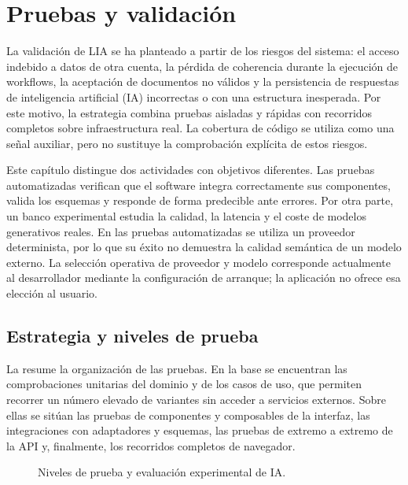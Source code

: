 \chapter{Pruebas y validación}
\label{chap:testing}

La validación de LIA se ha planteado a partir de los riesgos del sistema: el
acceso indebido a datos de otra cuenta, la pérdida de coherencia durante la
ejecución de workflows, la aceptación de documentos no válidos y la
persistencia de respuestas de inteligencia artificial (IA) incorrectas o con
una estructura inesperada. Por este motivo, la estrategia combina pruebas
aisladas y rápidas con recorridos completos sobre infraestructura real. La
cobertura de código se utiliza como una señal auxiliar, pero no sustituye la
comprobación explícita de estos riesgos.

Este capítulo distingue dos actividades con objetivos diferentes. Las pruebas
automatizadas verifican que el software integra correctamente sus componentes,
valida los esquemas y responde de forma predecible ante errores. Por otra
parte, un banco experimental estudia la calidad, la latencia y el coste de
modelos generativos reales. En las pruebas automatizadas se utiliza un
proveedor determinista, por lo que su éxito no demuestra la calidad semántica
de un modelo externo. La selección operativa de proveedor y modelo corresponde
actualmente al desarrollador mediante la configuración de arranque; la
aplicación no ofrece esa elección al usuario.

\section{Estrategia y niveles de prueba}
\label{sec:testing-strategy}

La  resume la organización de las pruebas. En la base
se encuentran las comprobaciones unitarias del dominio y de los casos de uso,
que permiten recorrer un número elevado de variantes sin acceder a servicios
externos. Sobre ellas se sitúan las pruebas de componentes y composables de la
interfaz, las integraciones con adaptadores y esquemas, las pruebas de extremo
a extremo de la API y, finalmente, los recorridos completos de navegador.

\begin{figure}[H]
  \centering
  \resizebox{\textwidth}{!}{%
    
  }
  \caption{Niveles de prueba y evaluación experimental de IA.}
  \label{fig:testing-levels}
\end{figure}


